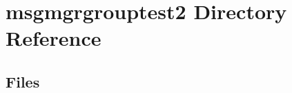 \section{msgmgrgrouptest2 Directory Reference}
\label{dir_705018871f2d5780d3c527ba08aec1a4}
\subsection*{Files}
\begin{DoxyCompactItemize}
\end{DoxyCompactItemize}
